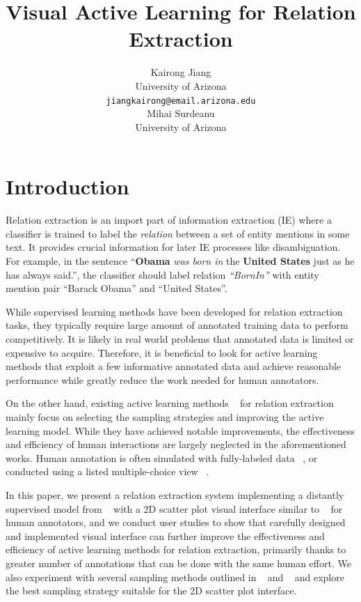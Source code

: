 \documentclass[11pt,a4paper]{article}
\title{Visual Active Learning for Relation Extraction}
\author{Kairong Jiang \\
    University of Arizona \\
    {\tt jiangkairong@email.arizona.edu}\\\And
    Mihai Surdeanu \\
    University of Arizona\\}
\date{}
\begin{document}
  \maketitle
  
  \section{Introduction}
  Relation extraction is an import part of information extraction (IE) where a classifier is trained to label the \emph{relation} between a set of entity mentions in some text. It provides crucial information for later IE processes like disambiguation. For example, in the sentence ``\textbf{Obama} \emph{was born in} the \textbf{United States} just as he has always said.'', the classifier should label relation \emph{``BornIn''} with entity mention pair ``Barack Obama'' and ``United States''.

  While supervised learning methods have been developed for relation extraction tasks, they typically require large amount of annotated training data to perform competitively. It is likely in real world problems that annotated data is limited or expensive to acquire. Therefore, it is beneficial to look for active learning methods that exploit a few informative annotated data and achieve reasonable performance while greatly reduce the work needed for human annotators. 
  
  On the other hand, existing active learning methods ~\cite{angeli2014combining, fu2013efficient, sun2012active} for relation extraction mainly focus on selecting the sampling strategies and improving the active learning model. While they have achieved notable improvements, the effectiveness and efficiency of human interactions are largely neglected in the aforementioned works. Human annotation is often simulated with fully-labeled data ~\cite{fu2013efficient, sun2012active}, or conducted using a listed multiple-choice view ~\cite{angeli2014combining}. 
  
  In this paper, we present a relation extraction system implementing a distantly supervised model from ~\citet{surdeanu2012multi} with a 2D scatter plot visual interface similar to ~\citet{berger2014visual} for human annotators, and we conduct user studies to show that carefully designed and implemented visual interface can further improve the effectiveness and efficiency of active learning methods for relation extraction, primarily thanks to greater number of annotations that can be done with the same human effort. We also experiment with several sampling methods outlined in ~\citet{angeli2014combining} and ~\citet{berger2014visual} and explore the best sampling strategy suitable for the 2D scatter plot interface.
\end{document}
